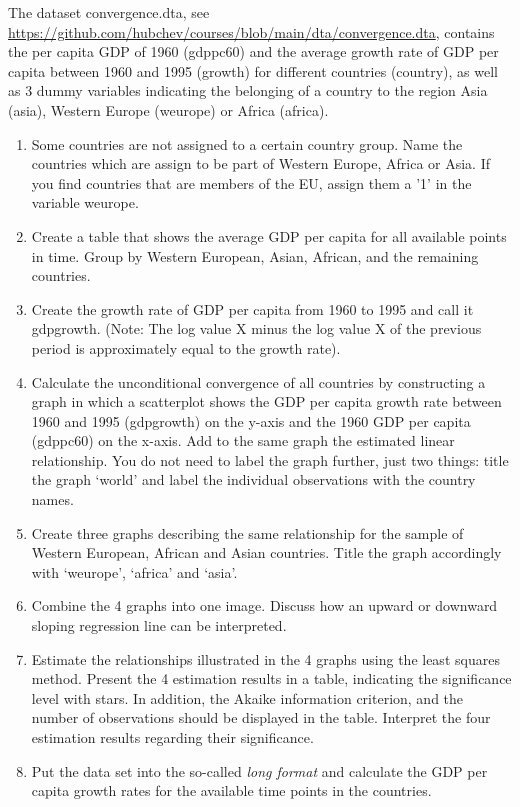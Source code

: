 The dataset convergence.dta, see  \url{https://github.com/hubchev/courses/blob/main/dta/convergence.dta}, contains the per capita GDP of 1960 (gdppc60) and the average growth rate of GDP per capita between 1960 and 1995 (growth) for different countries (country), as well as 3 dummy variables indicating the belonging of a country to the region Asia (asia), Western Europe (weurope) or Africa (africa). 

\begin{enumerate}[1)]
	\item Some countries are not assigned to a certain country group. Name the countries which are assign to be part of Western Europe, Africa or Asia.
	If you find countries that are members of the EU, assign them a '1' in the variable weurope.
	\item Create a table that shows the average GDP per capita for all available points in time. Group by Western European, Asian, African, and the remaining countries.
	\item Create the growth rate of GDP per capita from 1960 to 1995 and call it gdpgrowth. (Note: The log value X minus the log value X of the previous period is approximately equal to the growth rate).
	\item Calculate the unconditional convergence of all countries by constructing a graph in which a scatterplot shows the GDP per capita growth rate between 1960 and 1995 (gdpgrowth) on the y-axis and the 1960 GDP per capita (gdppc60) on the x-axis. Add to the same graph the estimated linear relationship. You do not need to label the graph further, just two things: title the graph `world' and label the individual observations with the country names.
	\item Create three graphs describing the same relationship for the sample of Western European, African and Asian countries. Title the graph accordingly with `weurope', `africa' and `asia'. 
	\item Combine the 4 graphs into one image. Discuss how an upward or downward sloping regression line can be interpreted.

	\item Estimate the relationships illustrated in the 4 graphs using the least squares method. Present the 4 estimation results in a table, indicating the significance level with stars. In addition, the Akaike information criterion, and the number of observations should be displayed in the table. Interpret the four estimation results regarding their significance. 
	\item Put the data set into the so-called \textit{long format} and calculate the GDP per capita growth rates for the available time points in the countries.
\end{enumerate}

